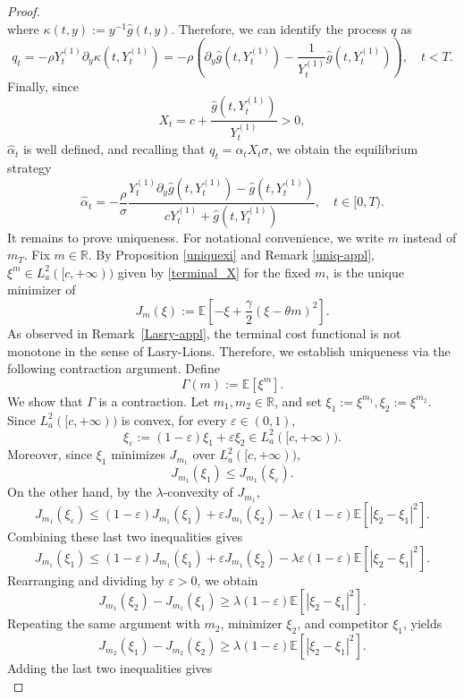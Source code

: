\documentclass[11pt,a4paper]{article}
\begin{document}
\begin{proof}
\[\]
where $\kappa (t,y) :=y^{-1}\hat g(t,y)$. Therefore, we can identify the process $q$ as
\[
q_t=-\rho Y_t^{(1)} \partial_y \kappa (t,Y^{(1)}_t)=-\rho
\left(
\partial_{y}\hat g(t,Y^{(1)}_t) - \frac{1}{Y^{(1)}_t} \hat g(t,Y^{(1)}_t)\right),\quad   t<T.
\]
Finally, since
\[
X_t=c+\frac{\hat g(t,Y_t^{(1)})}{Y_t^{(1)}}>0,
\]
\(\hat\alpha_t\) is well defined, and recalling that
\(q_t=\alpha_tX_t\sigma\), we obtain the equilibrium strategy
\begin{equation}
\label{opt-alpha}
\hat \alpha_t= -\frac{\rho}{\sigma}
\dfrac{Y^{(1)}_t\partial_{y}\hat g(t,Y^{(1)}_t) - \hat g(t,Y^{(1)}_t)}{cY^{(1)}_t+\hat g(t,Y^{(1)}_t)}, \quad t\in [0,T).
\end{equation}
It remains to prove uniqueness. For notational convenience, we write $m$ instead of $m_T$.	
Fix $m\in \mathbb R$. By Proposition \ref{uniquexi} and Remark \ref{uniq-appl}, $\xi^m\in L^2_a([c, +\infty))$ given by \eqref{terminal_X} for the fixed $m$, is  the unique minimizer of 
\[
J_m(\xi) := \mathbb E\left[-\xi+\frac{\gamma}{2}(\xi-\theta m)^2\right]. 
\]
As observed in  Remark~\ref{Lasry-appl}, the terminal cost functional is not monotone in the sense of Lasry-Lions. Therefore, we establish uniqueness via the following contraction argument.
Define
\[
\Gamma(m):=\mathbb E[\xi^m].
\]
We show that \(\Gamma\) is a contraction.
Let \(m_1,m_2\in\mathbb R\), and set
$\xi_1:=\xi^{m_1}, \xi_2:=\xi^{m_2}$.
Since \(L^2_a([c, +\infty))\) is convex, for every \(\varepsilon\in(0,1)\),
\[
\xi_\varepsilon:=(1-\varepsilon)\xi_1+\varepsilon\xi_2\in L^2_a([c, +\infty)).
\]
Moreover, since \(\xi_1\) minimizes \(J_{m_1}\) over \(L^2_a([c, +\infty))\),
\[
J_{m_1}(\xi_1)\le J_{m_1}(\xi_\varepsilon).
\]
On the other hand, by the \(\lambda\)-convexity of \(J_{m_1}\),
\[
J_{m_1}(\xi_\varepsilon)\le(1-\varepsilon)J_{m_1}(\xi_1)+\varepsilon J_{m_1}(\xi_2)-\lambda\varepsilon(1-\varepsilon)\mathbb E\left[|\xi_2-\xi_1|^2 \right].
\]
Combining these last two inequalities gives
\[
J_{m_1}(\xi_1)\le(1-\varepsilon)J_{m_1}(\xi_1)+\varepsilon J_{m_1}(\xi_2)-\lambda\varepsilon(1-\varepsilon)\mathbb E\left[|\xi_2-\xi_1|^2 \right].
\]
Rearranging and dividing by \(\varepsilon>0\), we obtain
\[
J_{m_1}(\xi_2)-J_{m_1}(\xi_1)\ge \lambda(1-\varepsilon)\mathbb E\left[|\xi_2-\xi_1|^2 \right].
\]
Repeating the same argument with \(m_2\), minimizer \(\xi_2\), and competitor \(\xi_1\), yields
\[
J_{m_2}(\xi_1)-J_{m_2}(\xi_2)\ge\lambda (1-\varepsilon)\mathbb E\left[|\xi_2-\xi_1|^2 \right].
\]
Adding the last two inequalities gives
\begin{equation}\label{ineq-m1m2}

\end{equation}
\end{proof}
\end{document}
